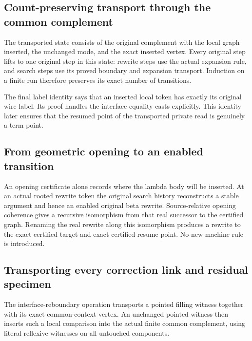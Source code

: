 \subsection{Count-preserving transport through the common complement}
The transported state consists of the original complement with the local graph inserted, the unchanged mode, and the exact inserted vertex. Every original step lifts to one original step in this state: rewrite steps use the actual expansion rule, and search steps use its proved boundary and expansion transport. Induction on a finite run therefore preserves its exact number of transitions.

The final label identity says that an inserted local token has exactly its original wire label. Its proof handles the interface equality casts explicitly. This identity later ensures that the resumed point of the transported private read is genuinely a term point.
\par{}

\subsection{From geometric opening to an enabled transition}
An opening certificate alone records where the lambda body will be inserted. At an actual rooted rewrite token the original search history reconstructs a stable argument and hence an enabled original beta rewrite. Source-relative opening coherence gives a recursive isomorphism from that real successor to the certified graph. Renaming the real rewrite along this isomorphism produces a rewrite to the exact certified target and exact certified resume point. No new machine rule is introduced.
\par{}

\subsection{Transporting every correction link and residual specimen}
The interface-reboundary operation transports a pointed filling witness together with its exact common-context vertex. An unchanged pointed witness then inserts such a local comparison into the actual finite common complement, using literal reflexive witnesses on all untouched components.


